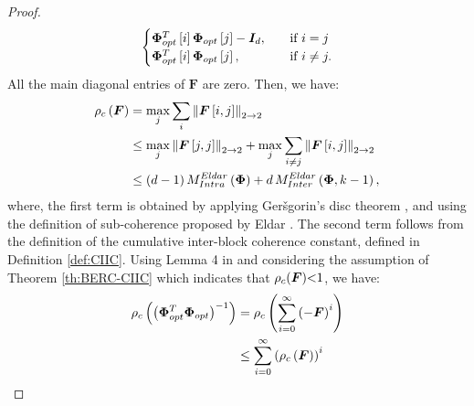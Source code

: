 \begin{proof}
\begin{equation*}
\begin{aligned}
\begin{cases}
    \boldsymbol{\Phi}_{opt}^T \left[ i \right] \boldsymbol{\Phi}_{opt} \left[ j \right]-\boldsymbol{I}_{d},   \quad &\text{if }i = j\\
        \boldsymbol{\Phi}_{opt}^T \left[ i \right] \boldsymbol{\Phi}_{opt} \left[ j \right],   \quad   &\text{if }i \neq j.
  \end{cases} 
  \end{aligned}
\end{equation*}
All the main diagonal entries of $\boldsymbol{F}$ are zero.
Then, we have:
\begin{gather*}
\begin{aligned}
\rho_c \left( \boldsymbol{F} \right) &=
\max_j \sum_i \left\lVert\boldsymbol{F}\left[ i,j \right]\right\rVert_{2 \to 2} \\
&\leq \max_j \left\lVert\boldsymbol{F}\left[ j,j \right]\right\rVert_{2 \to 2} + \max_j \sum_{i \neq j} \left\lVert\boldsymbol{F}\left[ i,j \right]\right\rVert_{2 \to 2} \\
&\leq \left( d-1 \right) M^{Eldar}_{Intra}\left( \boldsymbol{\Phi} \right) + d \, M^{Eldar}_{Inter}\left( \boldsymbol{\Phi} , k-1 \right),
\end{aligned}
\end{gather*}
where, the first term is obtained by applying Ger\v{s}gorin's disc theorem \cite{HornR.A.2012}, and using the definition of sub-coherence proposed by Eldar \cite{Eldar2010}.
{
\label{cmmnt:79} 
}
The second term follows from the definition of the cumulative inter-block coherence constant, defined in Definition \ref{def:CIIC}. 
Using Lemma 4 in \cite{Eldar2010} and considering the assumption of Theorem \ref{th:BERC-CIIC} which indicates that $\rho_c (\boldsymbol{F}) {<} 1$, we have:
\begin{gather*}
\begin{aligned}
\rho_c \myparanthese{\myparanthese{\myPhi_{opt}^T \myPhi_{opt}}^{-1}} &=
\rho_c \myparanthese{\sum_{i=0}^\infty \myparanthese{-\boldsymbol{F}}^i} \\
 &\leq \sum_{i=0}^\infty \myparanthese{\rho_c\myparanthese{\boldsymbol{F}}}^i \\

\end{aligned}
\end{gather*}
\end{proof}

